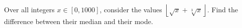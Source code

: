 Over all integers $x\in[0,1000]$, consider the values $\left\lfloor\sqrt x+\sqrt[3]x\right\rfloor$. Find the difference between their median and their mode.
